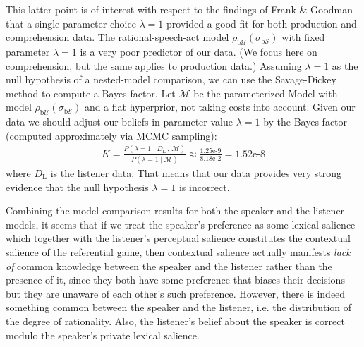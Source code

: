 This latter point is of interest with respect to the findings of Frank
\& Goodman that a single parameter choice $\lambda=1$ provided a good
fit for both production and comprehension data. The
rational-speech-act model
$\rho_{\mathrm{b}\mathcal{U}}(\sigma_{\mathrm{b}\mathcal{S}})$ with
fixed parameter $\lambda=1$ is a very poor predictor of our data. (We
focus here on comprehension, but the same applies to production data.)
Assuming $\lambda =1$ as the null hypothesis of a nested-model
comparison, we can use the Savage-Dickey method to compute a Bayes
factor.  Let $\mathcal{M}$ be the parameterized Model
with model
$\rho_{\mathrm{b}\mathcal{U}}(\sigma_{\mathrm{b}\mathcal{S}})$ and a
flat hyperprior, not taking costs into account. Given our data we
should adjust our beliefs in parameter value $\lambda=1$ by the Bayes
factor (computed approximately via MCMC sampling):
\begin{align*}
  K = \frac{P(\lambda=1 \mid D_\mathrm{L} \, , \, \mathcal{M})}{P(\lambda=1
    \mid \mathcal{M})} \approx \frac{1.25\text{e-9}}{8.18\text{e-2}} =
  1.52\text{e-8} 
\end{align*}
where $D_\mathrm{L}$ is the listener data. That means that our data
provides very strong evidence that the null hypothesis $\lambda=1$ is
incorrect.

\bigskip

Combining the model comparison results for both the speaker and the
listener models, it seems that if we treat the speaker's preference as
some lexical salience which together with the listener's perceptual
salience constitutes the contextual salience of the referential game,
then contextual salience actually manifests \emph{lack of} common
knowledge between the speaker and the listener rather than the
presence of it, since they both have some preference that biases their
decisions but they are unaware of each other's such
preference. However, there is indeed something common between the
speaker and the listener, i.e. the distribution of the degree of
rationality. Also, the listener's belief about the speaker is correct
modulo the speaker's private lexical salience.


